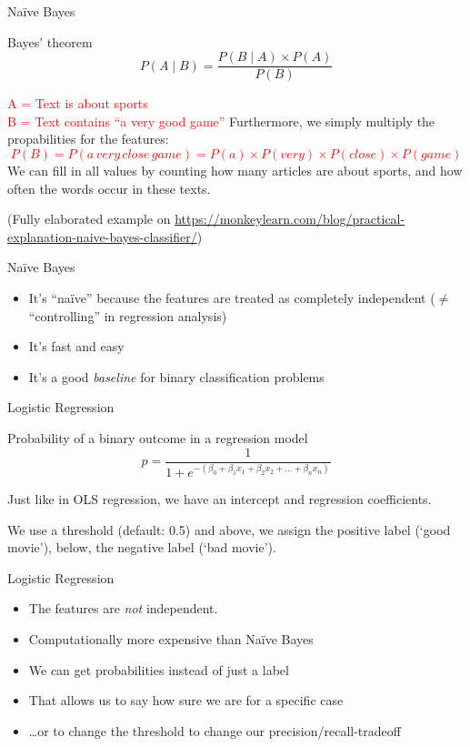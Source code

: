 \documentclass{beamer}
\begin{document}
\begin{frame}{Naïve Bayes}
\begin{block}{Bayes' theorem}
$$ P(A \mid B) = \frac{P(B \mid A) \times P(A)}{P(B)} $$
\end{block}

\pause
\textcolor{red}{A = Text is about sports\\
B = Text contains ``a very good game''}
\pause
Furthermore, we simply multiply the propabilities for the features:
\textcolor{red}{$$P(B) = P(a\, very\, close\, game) = P(a) \times P(very) \times P(close) \times P(game)$$}
We can fill in all values by counting how many articles are about sports, and how often the words occur in these texts.
\vspace{0.3cm}

\footnotesize{
(Fully elaborated example on \url{https://monkeylearn.com/blog/practical-explanation-naive-bayes-classifier/})}

\end{frame}


\begin{frame}{Naïve Bayes}
\begin{itemize}[<+->]
\item It's ``naïve'' because the features are treated as completely independent ($\neq$ ``controlling'' in regression analysis)
\item It's fast and easy
\item It's a good \emph{baseline} for binary classification problems
\end{itemize}
\end{frame}


\begin{frame}{Logistic Regression}
\begin{block}{Probability of a binary outcome in a regression model}
$$p = \frac{1}{1 + e^{-(\beta_0 + \beta_1 x_1 + \beta_2 x_2 + \ldots + \beta_n x_n)}}$$
\end{block}
Just like in OLS regression, we have an intercept and regression coefficients. 

We use a threshold (default: 0.5) and above, we assign the positive label (`good movie'), below, the negative label (`bad movie').

\end{frame}

\begin{frame}{Logistic Regression}
\begin{itemize}[<+->]
\item The features are \emph{not} independent.
\item Computationally more expensive than Naïve Bayes
\item We can get probabilities instead of just a label
\item That allows us to say how sure we are for a specific case
\item \ldots or to change the threshold to change our precision/recall-tradeoff
\end{itemize}
\end{frame}
\end{document}
